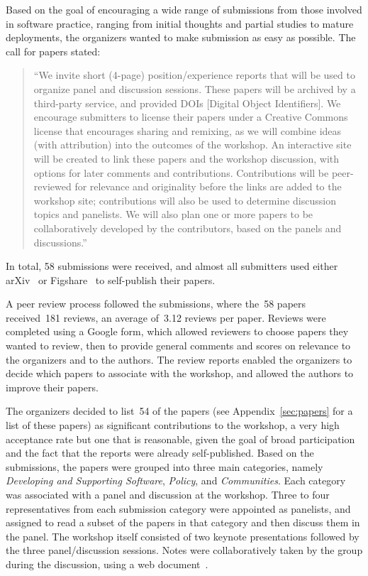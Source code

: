 \documentclass[11pt, oneside]{amsart}
\begin{document}
Based on the goal of encouraging a wide range of submissions from
those involved in software practice, ranging from initial thoughts and
partial studies to mature deployments, the organizers wanted to make
submission as easy as possible. The call for papers stated:

\begin{quote}
``We invite short (4-page) position/experience reports that will be used
to organize panel and discussion sessions. These papers will be
archived by a third-party service, and provided DOIs [Digital Object Identifiers].
We encourage
submitters to license their papers under a Creative Commons license
that encourages sharing and remixing, as we will combine ideas (with
attribution) into the outcomes of the workshop.  An interactive site
will be created to link these papers and the workshop discussion, with
options for later comments and contributions. Contributions will be
peer-reviewed for relevance and originality before the links are added
to the workshop site; contributions will also be used to determine
discussion topics and panelists. We will also plan one or more papers
to be collaboratively developed by the contributors, based on the
panels and discussions.''
\end{quote}

In total, 58 submissions were received, and almost all submitters used either
arXiv~\cite{arXiv-web} or Figshare~\cite{figshare-web} to self-publish
their papers.

A peer review process followed the submissions, where
the~58 papers received~181 reviews, an average of~3.12 reviews per
paper. Reviews were completed using a Google form, which allowed
reviewers to choose papers they wanted to review, then to provide
general comments and scores on relevance to the organizers and
to the authors. The review reports enabled the organizers to decide
which papers to associate with the workshop, and allowed the authors
to improve their papers.

The organizers decided to list~54 of the papers (see Appendix~\ref{sec:papers} for a list of these papers) as significant
contributions to the workshop, a very high acceptance rate but one
that is reasonable, given the goal of broad participation and the fact
that the reports were already self-published. Based on the submissions, the papers were
grouped into three main categories, namely \emph{Developing and
Supporting Software}, \emph{Policy}, and \emph{Communities}. Each
category was associated with a panel and discussion at the
workshop.  Three to four representatives from each submission
category were appointed as panelists, and assigned to read a subset of
the papers in that category and then discuss them in the panel.
The workshop itself consisted of two keynote presentations followed by the 
three panel/discussion sessions.  Notes were collaboratively taken
by the group during the discussion, using a web document~\cite{WSSSPE1-google-notes}.
\end{document}
